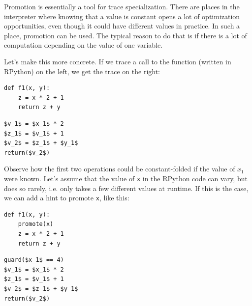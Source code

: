 \documentclass[preprint]{sigplanconf}
\newcommand{\noop}{}
\begin{document}
Promotion is essentially a tool for trace specialization. There are places in
the interpreter where knowing that a value is constant opens a lot of
optimization opportunities, even though it
could have different values in practice. In such a place, promotion can be used. The
typical reason to do that is if there is
a lot of computation depending on the value of one variable.

Let's make this more concrete. If we trace a call to the function (written in
RPython) on the left, we get the trace on the right:

\begin{minipage}[b]{0.5\linewidth}
\centering
{\noop
\begin{lstlisting}[mathescape,basicstyle=\ttfamily]
def f1(x, y):
    z = x * 2 + 1
    return z + y
\end{lstlisting}
}
\end{minipage}
\vline
\hspace{0.5cm}
\begin{minipage}[b]{0.5\linewidth}
{\noop
\begin{lstlisting}[mathescape,basicstyle=\ttfamily]
$v_1$ = $x_1$ * 2
$z_1$ = $v_1$ + 1
$v_2$ = $z_1$ + $y_1$
return($v_2$)
\end{lstlisting}
}
\end{minipage}

Observe how the first two operations could be constant-folded if the value of
$x_1$ were known. Let's assume that the value of \texttt{x} in the RPython code can vary, but does so
rarely, i.e. only takes a few different values at runtime. If this is the
case, we can add a hint to promote \texttt{x}, like this:


\begin{minipage}[b]{0.5\linewidth}
\centering
{\noop
\begin{lstlisting}[mathescape,basicstyle=\ttfamily]
def f1(x, y):
    promote(x)
    z = x * 2 + 1
    return z + y
\end{lstlisting}
}
\end{minipage}
\vline
\hspace{0.5cm}
\begin{minipage}[b]{0.5\linewidth}
{\noop
\begin{lstlisting}[mathescape,basicstyle=\ttfamily]
guard($x_1$ == 4)
$v_1$ = $x_1$ * 2
$z_1$ = $v_1$ + 1
$v_2$ = $z_1$ + $y_1$
return($v_2$)
\end{lstlisting}
}
\end{minipage}
\end{document}
